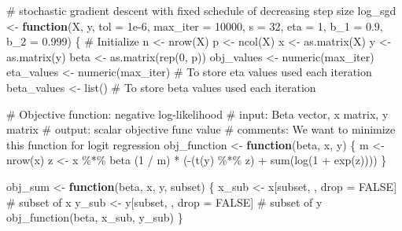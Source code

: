 \documentclass[
  letterpaper,
  DIV=11,
  numbers=noendperiod]{scrartcl}
\newenvironment{Shaded}{\begin{snugshade}}{\end{snugshade}}
\newcommand{\AttributeTok}[1]{\textcolor[rgb]{0.40,0.45,0.13}{#1}}
\newcommand{\CommentTok}[1]{\textcolor[rgb]{0.37,0.37,0.37}{#1}}
\newcommand{\ConstantTok}[1]{\textcolor[rgb]{0.56,0.35,0.01}{#1}}
\newcommand{\ControlFlowTok}[1]{\textcolor[rgb]{0.00,0.23,0.31}{\textbf{#1}}}
\newcommand{\DecValTok}[1]{\textcolor[rgb]{0.68,0.00,0.00}{#1}}
\newcommand{\FloatTok}[1]{\textcolor[rgb]{0.68,0.00,0.00}{#1}}
\newcommand{\FunctionTok}[1]{\textcolor[rgb]{0.28,0.35,0.67}{#1}}
\newcommand{\NormalTok}[1]{\textcolor[rgb]{0.00,0.23,0.31}{#1}}
\newcommand{\OtherTok}[1]{\textcolor[rgb]{0.00,0.23,0.31}{#1}}
\newcommand{\SpecialCharTok}[1]{\textcolor[rgb]{0.37,0.37,0.37}{#1}}
\begin{document}
\begin{Shaded}
\begin{Highlighting}[]
\CommentTok{\# stochastic gradient descent with fixed schedule of decreasing step size}
\NormalTok{log\_sgd }\OtherTok{\textless{}{-}} \ControlFlowTok{function}\NormalTok{(X, y, }\AttributeTok{tol =} \FloatTok{1e{-}6}\NormalTok{, }\AttributeTok{max\_iter =} \DecValTok{10000}\NormalTok{, }\AttributeTok{s =} \DecValTok{32}\NormalTok{, }\AttributeTok{eta =} \DecValTok{1}\NormalTok{, }\AttributeTok{b\_1 =} \FloatTok{0.9}\NormalTok{, }\AttributeTok{b\_2 =} \FloatTok{0.999}\NormalTok{) \{}
  \CommentTok{\# Initialize}
\NormalTok{  n }\OtherTok{\textless{}{-}} \FunctionTok{nrow}\NormalTok{(X)}
\NormalTok{  p }\OtherTok{\textless{}{-}} \FunctionTok{ncol}\NormalTok{(X)}
\NormalTok{  x }\OtherTok{\textless{}{-}} \FunctionTok{as.matrix}\NormalTok{(X)}
\NormalTok{  y }\OtherTok{\textless{}{-}} \FunctionTok{as.matrix}\NormalTok{(y)}
\NormalTok{  beta }\OtherTok{\textless{}{-}} \FunctionTok{as.matrix}\NormalTok{(}\FunctionTok{rep}\NormalTok{(}\DecValTok{0}\NormalTok{, p))}
\NormalTok{  obj\_values }\OtherTok{\textless{}{-}} \FunctionTok{numeric}\NormalTok{(max\_iter)}
\NormalTok{  eta\_values }\OtherTok{\textless{}{-}} \FunctionTok{numeric}\NormalTok{(max\_iter)  }\CommentTok{\# To store eta values used each iteration}
\NormalTok{  beta\_values }\OtherTok{\textless{}{-}} \FunctionTok{list}\NormalTok{() }\CommentTok{\# To store beta values used each iteration}
  
  \CommentTok{\# Objective function: negative log{-}likelihood}
  \CommentTok{\# input: Beta vector, x matrix, y matrix}
  \CommentTok{\# output: scalar objective func value}
  \CommentTok{\# comments: We want to minimize this function for logit regression}
\NormalTok{  obj\_function }\OtherTok{\textless{}{-}} \ControlFlowTok{function}\NormalTok{(beta, x, y) \{}
\NormalTok{    m }\OtherTok{\textless{}{-}} \FunctionTok{nrow}\NormalTok{(x)}
\NormalTok{    z }\OtherTok{\textless{}{-}}\NormalTok{ x }\SpecialCharTok{\%*\%}\NormalTok{ beta}
\NormalTok{    (}\DecValTok{1} \SpecialCharTok{/}\NormalTok{ m) }\SpecialCharTok{*}\NormalTok{ (}\SpecialCharTok{{-}}\NormalTok{(}\FunctionTok{t}\NormalTok{(y) }\SpecialCharTok{\%*\%}\NormalTok{ z) }\SpecialCharTok{+} \FunctionTok{sum}\NormalTok{(}\FunctionTok{log}\NormalTok{(}\DecValTok{1} \SpecialCharTok{+} \FunctionTok{exp}\NormalTok{(z))))}
\NormalTok{  \}}
  
\NormalTok{  obj\_sum }\OtherTok{\textless{}{-}} \ControlFlowTok{function}\NormalTok{(beta, x, y, subset) \{}
\NormalTok{    x\_sub }\OtherTok{\textless{}{-}}\NormalTok{ x[subset, , drop }\OtherTok{=} \ConstantTok{FALSE}\NormalTok{]   }\CommentTok{\# subset of x}
\NormalTok{    y\_sub }\OtherTok{\textless{}{-}}\NormalTok{ y[subset, , drop }\OtherTok{=} \ConstantTok{FALSE}\NormalTok{]   }\CommentTok{\# subset of y}
    \FunctionTok{obj\_function}\NormalTok{(beta, x\_sub, y\_sub)}
\NormalTok{  \}}
  

\end{Highlighting}
\end{Shaded}
\end{document}
